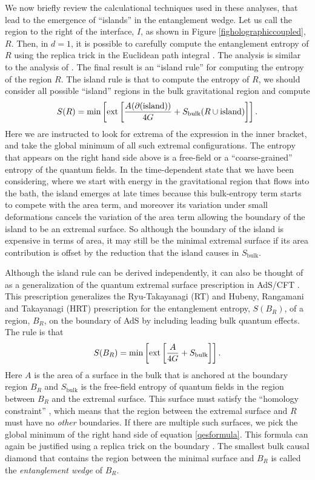 \documentclass[12pt]{article}
\def\gnewt{G}
\newcommand{\be}{\begin{equation}}
\newcommand{\ee}{\end{equation}}
\begin{document}
We now briefly review the calculational techniques used in these analyses, that lead to the emergence of ``islands'' in the entanglement wedge.
Let us call the region to the right of the interface, $I$, as shown in Figure \ref{figholographiccoupled}, $R$.  Then, in $d = 1$, it is possible to carefully compute the entanglement entropy of $R$ using the replica trick in the Euclidean path integral \cite{Almheiri:2019qdq,Penington:2019kki}. The analysis is similar to the analysis of \cite{Lewkowycz:2013nqa}. The final result is an ``island rule'' for computing the entropy of the region $R$. The island
rule is that to compute the entropy of $R$, we should consider all possible ``island'' regions in the bulk gravitational region and compute
\be
\label{islandformula}
S(R) = \text{min}\left[ \text{ext} \left[{A(\partial(\text{island})) \over 4 \gnewt} + S_{\text{bulk}}(R \cup \text{island}) \right]\right].
\ee
Here we are instructed to look for extrema of the expression in the inner bracket, and take the global minimum of all such extremal configurations.
The entropy that appears on the right hand side above  is a free-field or a ``coarse-grained'' entropy of the quantum fields. In the time-dependent state that we have been considering, where we start with energy in the
gravitational region that flows into the bath,  the island emerges at late times because this bulk-entropy term  starts to compete with the area term, and moreover its variation under small deformations cancels the variation of the area term allowing the boundary of the island to be an extremal surface. So although the boundary of the island is expensive in terms of area, it may still be the minimal extremal surface  if its area contribution is offset by the reduction
that the island causes in $S_{\text{bulk}}$. 

Although the island rule can be derived independently, it can also be thought of as a generalization of the quantum extremal surface prescription in AdS/CFT \cite{Engelhardt:2014gca}. This prescription generalizes the Ryu-Takayanagi (RT)  \cite{Ryu:2006bv,Ryu:2006ef} and  Hubeny, Rangamani and Takayanagi  (HRT) \cite{Hubeny:2007xt} prescription for the entanglement entropy, $S(B_R)$, of a region, $B_R$, on the boundary of AdS  by including leading bulk quantum effects. The rule is that
\be
\label{qesformula}
S(B_R) = \text{min}\left[ \text{ext} \left[{A \over 4 \gnewt} + S_{\text{bulk}} \right]\right].
\ee
Here $A$ is the area of a surface in the bulk that is anchored at the boundary region $B_R$ and $S_{\text{bulk}}$ is the free-field entropy of quantum fields in the region between $B_R$ and the extremal surface. This surface must satisfy the ``homology constraint'' \cite{Headrick:2014cta,Headrick:2013zda}, which means that the region between the extremal surface and $R$ must have no {\em other} boundaries.   If there are multiple such surfaces, we pick the global minimum of the right hand side of equation \eqref{qesformula}. This formula can again be justified using a replica trick on the boundary \cite{Faulkner:2013ana}. The smallest bulk causal diamond that contains the region between the minimal surface and $B_R$ is called the {\em entanglement wedge} of $B_R$. 
\end{document}
